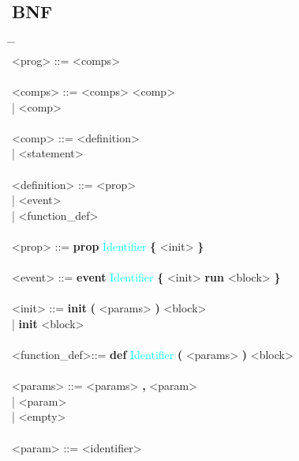 \documentclass{Dokumentmall}
\begin{document}
\newpage
\subsection{BNF}

\begin{tabbing}
  \= {} {} {} {} {} {} {} {} {} {} {} {} {} {} {} {} {} {} {} {} {} {} {} {} {} {} {} \= {} {} {} {} {} {} {} {} {} {} {} {} {} {} {} {} {} {}\= \\
  \><prog> \>::= \><comps> \\\\
  \><comps>  \>::= \><comps> <comp>\\
  \> \> | \> <comp> \\\\

  \><comp> \>::= \><definition>\\
  \> \>| \><statement>\\\\

  \><definition> \>::= \><prop>\\
  \> \>| \> <event> \\
  \> \>| \> <function\_def>\\\\

  \><prop> \>::= \>\textbf{prop} \textcolor{Cyan}{Identifier} \textbf{\{} <init> \textbf{\}}\\\\

  \><event> \>::= \>\textbf{event} \textcolor{Cyan}{Identifier} \textbf{\{} <init> \textbf{run} <block> \textbf{\}}\\\\

  \><init> \>::= \>\textbf{init} \textbf{(} <params> \textbf{)} <block>\\
  \> \>| \> \textbf{init} <block>\\\\

  \><function\_def>\>::= \>\textbf{def} \textcolor{Cyan}{Identifier} \textbf{(} <params> \textbf{)} <block>\\\\

  \><params> \>::= \><params> \textbf{,} <param>\\
  \> \>| \> <param>\\
  \> \>| \> <empty>\\\\

  \><param> \>::= \><identifier>\\\\


\end{tabbing}
\end{document}
